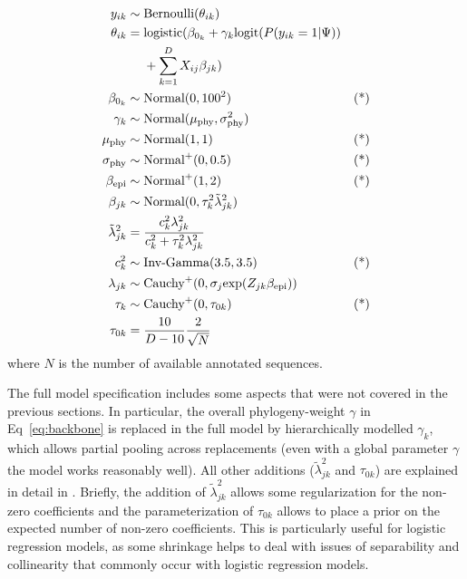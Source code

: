 \documentclass{bioinfo}
\begin{document}
\begin{methods}
\begin{equation}
  \label{eq:full}
  \begin{aligned}
   y_{ik} &\sim \text{Bernoulli}(\theta_{ik}) &\\
   \theta_{ik} &=
        \text{logistic}(\beta_{0_{k}} + \gamma_{k}\text{logit}(P(y_{ik}=1|\Psi)) & \\
        \hspace{-6cm} &~~~~ +\sum_{k=1}^{D}X_{ij}\beta_{jk}) & \\
    \beta_{0_{k}} &\sim \text{Normal}(0, 100^2) & \text{(*)}\\
   \gamma_{k} &\sim \text{Normal}(\mu_{\text{phy}}, \sigma_{\text{phy}}^2) & \\
    \mu_{\text{phy}} &\sim \text{Normal}(1, 1) & \text{(*)} \\
   \sigma_{\text{phy}} &\sim \text{Normal}^{+}(0, 0.5) & \text{(*)} \\
   \beta_{\text{epi}} &\sim \text{Normal}^{+}(1, 2) & \text{(*)} \\
   \beta_{jk} &\sim \text{Normal}(0, \tau_{k}^{2}\tilde{\lambda}^{2}_{jk}) & \\
   \tilde{\lambda}^{2}_{jk} &= \frac{c_{k}^{2}\lambda_{jk}^{2}}{c_{k}^{2} + \tau_{k}^{2}\lambda_{jk}^{2}} & \\
    c_{k}^2 &\sim \text{Inv-Gamma}(3.5, 3.5) & \text{(*)} \\
   \lambda_{jk} &\sim \text{Cauchy}^{+}(0, \sigma_{j}\text{exp}(Z_{jk}\beta_{\text{epi}})) & \\
   \tau_{k} &\sim \text{Cauchy}^{+}(0, \tau_{0k}) & \text{(*)} \\
   \tau_{0k} &= \frac{10}{D-10}\frac{2}{\sqrt{N}} & \\
  \end{aligned}
\end{equation}
where \(N\) is the number of available annotated sequences.

The full model specification includes some aspects that were not covered in the previous sections. In particular, the overall phylogeny-weight $\gamma$ in Eq~\ref{eq:backbone} is replaced in the full model by  hierarchically modelled  \(\gamma_{k}\), which allows partial pooling across replacements (even with a global parameter \(\gamma\) the model works reasonably well). All other additions (\(\tilde{\lambda}_{jk}^{2}\) and \(\tau_{0k}\)) are explained in detail in \citet{Piironen2017}. Briefly, the addition of  \(\tilde{\lambda}_{jk}^{2}\) allows some regularization for the non-zero coefficients and the parameterization of \(\tau_{0k}\) allows to place a prior on the expected number of non-zero coefficients.  This is particularly useful for logistic regression models, as some shrinkage helps to deal with issues of separability and collinearity that commonly occur with logistic regression models.


\end{methods}
\end{document}
